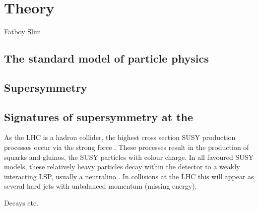 \chapter{Theory}
\label{chap:theory}

{Fatboy Slim}

\section{The standard model of particle physics}
\label{sec:sm}


\section{Supersymmetry}
\label{sec:susy}


\section{Signatures of supersymmetry at the \LHC}

As the LHC is a hadron collider, the highest cross section SUSY
production processes occur via the strong force
\cite{SUSYprimerMartin:1997ns}
\cite{SUSYxsections_NewAspectsof_pp_collisions}. These processes
result in the production of squarks and gluinos, the SUSY particles
with colour charge. In all favoured SUSY models, these relatively
heavy particles decay within the detector to a weakly interacting LSP,
usually a neutralino \cite{SUSYPhe_hadronic_states_Farrar:1978xj}. In
collisions at the LHC this will appear as several hard jets with
unbalanced momentum (missing energy). 

Decays etc.
